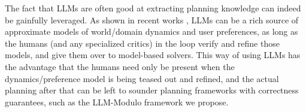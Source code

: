 \documentclass{article}
\newcommand{\bnote}[1]{\color{black}#1\color{black}}
\newcommand{\rao}[1]{\noindent\textcolor{red}{#1}}
\theoremstyle{plain}
\theoremstyle{definition}
\theoremstyle{remark}
\begin{document}
%
%














The fact that LLMs are often good at extracting planning knowledge can indeed be gainfully leveraged. As shown in recent works \cite{guan2023leveraging}, LLMs can be a rich source of approximate models of world/domain dynamics and user preferences, as long as the humans (and any specialized critics) in the loop verify and refine those models, and give them over to model-based solvers. This way of using LLMs has the advantage that the humans need only be present when the dynamics/preference model is being teased out and refined, and the actual planning after that can be left to  
sounder planning frameworks with correctness guarantees, such as the LLM-Modulo framework we propose.  
\end{document}
